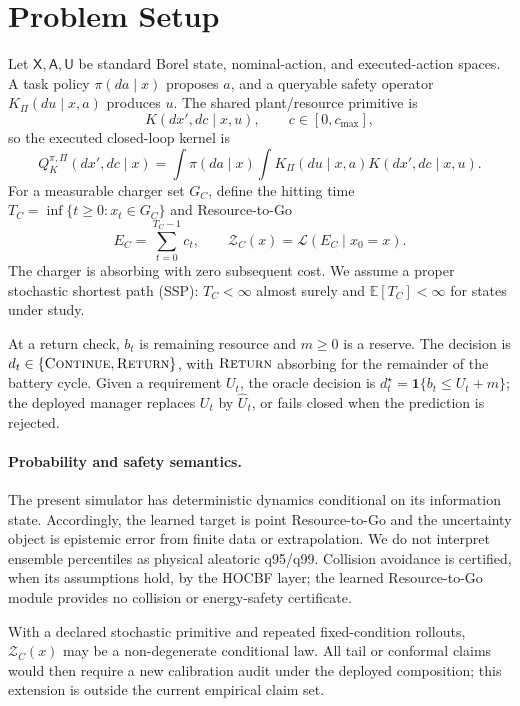 \section{Problem Setup}
\label{sec:problem}

Let \(\mathsf X,\mathsf A,\mathsf U\) be standard Borel state, nominal-action, and executed-action spaces. A task policy \(\pi(da\mid x)\) proposes \(a\), and a queryable safety operator \(K_\Pi(du\mid x,a)\) produces \(u\). The shared plant/resource primitive is
\[
K(dx',dc\mid x,u),\qquad c\in[0,c_{\max}],
\]
so the executed closed-loop kernel is
\begin{equation}
Q^{\pi,\Pi}_K(dx',dc\mid x)
=\int\pi(da\mid x)\int K_\Pi(du\mid x,a)K(dx',dc\mid x,u).
\label{eq:closedloop}
\end{equation}
For a measurable charger set \(G_C\), define the hitting time \(T_C=\inf\{t\geq0:x_t\in G_C\}\) and Resource-to-Go
\begin{equation}
E_C=\sum_{t=0}^{T_C-1}c_t, \qquad \mathcal Z_C(x)=\mathcal L(E_C\mid x_0=x).
\label{eq:rtg}
\end{equation}
The charger is absorbing with zero subsequent cost. We assume a proper stochastic shortest path (SSP): \(T_C<\infty\) almost surely and \(\mathbb E[T_C]<\infty\) for states under study.

At a return check, \(b_t\) is remaining resource and \(m\geq0\) is a reserve. The decision is \(d_t\in\{\textsc{Continue},\textsc{Return}\}\), with \(\textsc{Return}\) absorbing for the remainder of the battery cycle. Given a requirement \(U_t\), the oracle decision is \(d_t^\star=\mathbf{1}\{b_t\leq U_t+m\}\); the deployed manager replaces \(U_t\) by \(\widehat U_t\), or fails closed when the prediction is rejected.

\paragraph{Probability and safety semantics.}
The present simulator has deterministic dynamics conditional on its information state. Accordingly, the learned target is point Resource-to-Go and the uncertainty object is epistemic error from finite data or extrapolation. We do not interpret ensemble percentiles as physical aleatoric q95/q99. Collision avoidance is certified, when its assumptions hold, by the HOCBF layer; the learned Resource-to-Go module provides no collision or energy-safety certificate.

\begin{remark}
With a declared stochastic primitive and repeated fixed-condition rollouts, \(\mathcal Z_C(x)\) may be a non-degenerate conditional law. All tail or conformal claims would then require a new calibration audit under the deployed composition; this extension is outside the current empirical claim set.
\end{remark}
